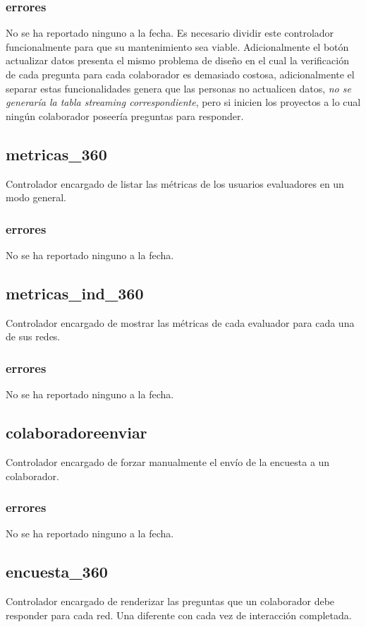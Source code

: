 \documentclass[10pt,a4paper]{book}
\begin{document}
	\subsubsection{errores}
	No se ha reportado ninguno a la fecha. Es necesario dividir este controlador funcionalmente para que su mantenimiento sea viable. Adicionalmente el botón actualizar datos presenta el mismo problema de diseño en el cual la verificación de cada pregunta para cada colaborador es demasiado costosa, adicionalmente el separar estas funcionalidades genera que las personas no actualicen datos, \textit{no se generaría la tabla streaming correspondiente}, pero si inicien los proyectos a lo cual ningún colaborador poseería preguntas para responder.
	
	\subsection{metricas\_360}
	Controlador encargado de listar las métricas de los usuarios evaluadores en un modo general.
	\subsubsection{errores}
	No se ha reportado ninguno a la fecha.

	\subsection{metricas\_ind\_360}
	Controlador encargado de mostrar las métricas de cada evaluador para cada una de sus redes.
	\subsubsection{errores}
	No se ha reportado ninguno a la fecha.

	\subsection{colaboradoreenviar}
	Controlador encargado de forzar manualmente el envío de la encuesta a un colaborador.
	\subsubsection{errores}
	No se ha reportado ninguno a la fecha.

	\subsection{encuesta\_360}
	Controlador encargado de renderizar las preguntas que un colaborador debe responder para cada red. Una diferente con cada vez de interacción completada.
\end{document}
